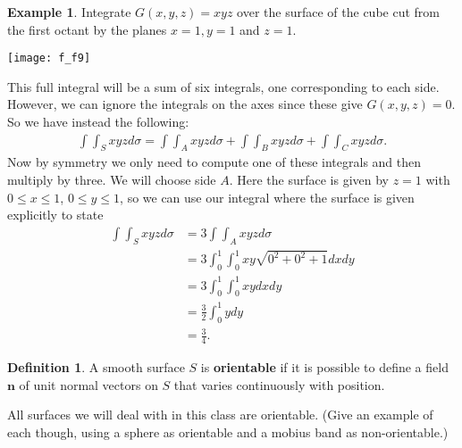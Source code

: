 \documentclass[12pt, letter]{article}
\theoremstyle{plain}
\numberwithin{theorem}{section}
\theoremstyle{definition}
\newtheorem{definition}[theorem]{Definition}
\newtheorem{example}[theorem]{Example}
\begin{document}
\bigskip

\begin{example}
Integrate $G(x,y,z) = xyz$ over the surface of the cube cut from the first octant by the planes $x=1, y=1$ and $z=1$.

\bigskip

\begin{center}
\texttt{[image: f\_f9]}
\end{center}

\bigskip

This full integral will be a sum of six integrals, one corresponding to each side. However, we can ignore the integrals on the axes since these give $G(x,y,z)=0$. So we have instead the following:
\begin{align*}
\int\int_S xyz d\sigma = \int\int_A xyzd\sigma+\int\int_B xyzd\sigma+\int\int_C xyzd\sigma.
\end{align*}
Now by symmetry we only need to compute one of these integrals and then multiply by three. We will choose side $A$. Here the surface is given by $z=1$ with $0\leq x\leq 1$, $0\leq y \leq 1$, so we can use our integral where the surface is given explicitly to state
\begin{align*}
\int\int_S xyzd\sigma &= 3\int\int_A xyzd\sigma\\
&= 3 \int_0^1\int_0^1 xy \sqrt{0^2+0^2+1}dxdy\\
&= 3 \int_0^1\int_0^1xydxdy\\
&= \frac{3}{2} \int_0^1 ydy\\
&= \frac{3}{4}.
\end{align*}
\end{example}

\bigskip

\hrulefill

\bigskip

\begin{definition}
A smooth surface $S$ is \textbf{orientable} if it is possible to define a field $\bm{n}$ of unit normal vectors on $S$ that varies continuously with position.
\end{definition}

\bigskip

All surfaces we will deal with in this class are orientable. (Give an example of each though, using a sphere as orientable and a mobius band as non-orientable.)

\bigskip

\hrulefill

\bigskip
\end{document}
